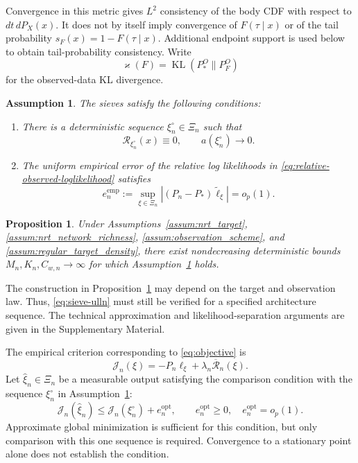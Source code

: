 \documentclass[11pt]{article}
\numberwithin{equation}{section}
\newtheorem{proposition}{Proposition}
\newtheorem{assum}{Assumption}
\begin{document}
Convergence in this metric gives $L^2$ consistency of the body CDF with respect to $dt\,dP_X(x)$. It does not by itself imply convergence of $F(\tau\mid x)$ or of the tail probability $s_F(x)=1-F(\tau\mid x)$. Additional endpoint support is used below to obtain tail-probability consistency. Write
\[
    \varkappa(F)=\operatorname{KL}(P_*^O\|P_F^O)
\]
for the observed-data KL divergence.

\begin{assum}
\label{assum:sieve_consistency}
The sieves satisfy the following conditions:
\begin{enumerate}
    \item There is a deterministic sequence $\xi_n^\circ\in\Xi_n$ such that
    \begin{equation}
        \mathcal R_{\xi_n^\circ}(x)\equiv0,
        \qquad a(\xi_n^\circ)\longrightarrow0.
        \label{eq:slow-sieve-approximation}
    \end{equation}
    \item The uniform empirical error of the relative log likelihoods in \eqref{eq:relative-observed-loglikelihood} satisfies
    \begin{equation}
        e_n^{\mathrm{emp}}:=\sup_{\xi\in\Xi_n}|(P_n-P_*)\widetilde\ell_\xi|=o_p(1).
        \label{eq:sieve-ulln}
    \end{equation}
\end{enumerate}
\end{assum}

\begin{proposition}
\label{prop:nrt_slow_sieve}
Under Assumptions~\ref{assum:nrt_target}, \ref{assum:nrt_network_richness}, \ref{assum:observation_scheme}, and \ref{assum:regular_target_density}, there exist nondecreasing deterministic bounds $M_n,K_n,C_{w,n}\to\infty$ for which Assumption~\ref{assum:sieve_consistency} holds.
\end{proposition}

The construction in Proposition~\ref{prop:nrt_slow_sieve} may depend on the target and observation law. Thus, \eqref{eq:sieve-ulln} must still be verified for a specified architecture sequence. The technical approximation and likelihood-separation arguments are given in the Supplementary Material.

The empirical criterion corresponding to \eqref{eq:objective} is
\[
    \mathcal J_n(\xi)
       =-P_n\ell_\xi+\lambda_n\overline{\mathcal R}_n(\xi).
\]
Let $\widehat\xi_n\in\Xi_n$ be a measurable output satisfying the comparison condition with the sequence $\xi_n^\circ$ in Assumption~\ref{assum:sieve_consistency}:
\begin{equation}
    \mathcal J_n(\widehat\xi_n)
       \leq\mathcal J_n(\xi_n^\circ)+e_n^{\mathrm{opt}},
       \qquad e_n^{\mathrm{opt}}\geq0,\quad e_n^{\mathrm{opt}}=o_p(1).
    \label{eq:approximate-penalized-sieve}
\end{equation}
Approximate global minimization is sufficient for this condition, but only comparison with this one sequence is required. Convergence to a stationary point alone does not establish the condition.
\end{document}
